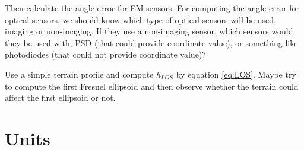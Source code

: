 \documentclass{article}
\begin{document}
Then calculate the angle error for EM sensors. For computing the angle error for optical sensors, we should know which type of optical sensors will be used, imaging or non-imaging. If they use a non-imaging sensor, which sensors would they be used with, PSD (that could provide coordinate value), or something like photodiodes (that could not provide coordinate value)?

Use a simple terrain profile and compute $h_{LOS}$ by equation \ref{eq:LOS}. Maybe try to compute the first Fresnel ellipsoid and then observe whether the terrain could affect the first ellipsoid or not.

\section{Units}
\end{document}
